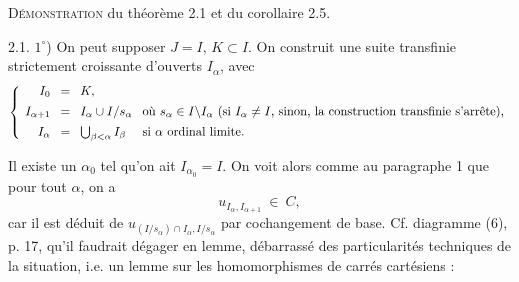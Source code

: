 \textsc{Démonstration} du théorème 2.1 et du corollaire 2.5.

2.1. $1^\circ$) On peut supposer $J = I$, $K \subset I$. On construit une suite transfinie strictement croissante d'ouverts $I_\alpha$, avec
\[
\left\{
\setlength{\arraycolsep}{4pt}
\begin{array}{rcll}
I_0 & = & K, & \\[1ex]
I_{\alpha+1} & = & I_\alpha \cup I/s_\alpha & \text{où } s_\alpha \in I\backslash I_\alpha \text{ (si } I_\alpha \neq I\text{, sinon, la construction transfinie s'arrête),}\\[1ex]
I_\alpha & = & \bigcup_{\beta<\alpha} I_\beta & \text{si } \alpha \text{ ordinal limite.}
\end{array}
\right.
\]

Il existe un $\alpha_0$ tel qu'on ait $I_{\alpha_0} = I$. On voit alors comme au paragraphe 1
que pour tout $\alpha$, on a
\[
u_{I_\alpha,I_{\alpha+1}} \ \in\ C,
\tag*{$(*)$}
\]
car il est déduit de $u_{(I/s_\alpha)\cap I_\alpha,I/s_\alpha}$ par cochangement de base. Cf. diagramme (6), p. 17, qu'il faudrait dégager en lemme, débarrassé des particularités techniques de la situation, i.e. un lemme sur les homomorphismes de carrés cartésiens :

